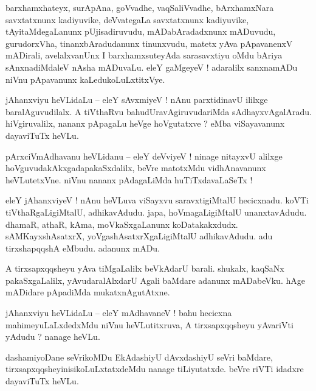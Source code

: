 \documentclass{article}
\begin{document}
\begin{mn}%
barxhamxhateyx, surApAna, goVvadhe, vaqSaliVvadhe, bArxhamxNara savxtatxnunx kadiyuvike, 
deVvategaLa savxtatxnunx kadiyuvike, tAyitaMdegaLanunx pUjisadiruvudu, mADabAradadxnunx mADuvudu, 
gurudorxVha, tinanxbAradudanunx tinunxvudu, matetx yAva pApavanenxV mADirali, avelalxvanUnx I 
barxhamxsuteyAda sarasavxtiyu oMdu bAriya sAnxnadiMdaleV nAsha mADuvaLu. eleY gaMgeyeV ! adaralilx 
sanxnamADu niVnu pApavanunx kaLedukoLuLxtitxVye.
\end{mn}

\begin{mn}%
jAhanxviyu heVLidaLu -- eleY sAvxmiyeV ! nAnu parxtidinavU ililxge baralAguvudilalx. A tiVthaRvu 
bahudUravAgiruvudariMda sAdhayxvAgalAradu. hiVgiruvalilx, nananx pApagaLu heVge hoVgutatxve ? eMba 
viSayavanunx dayaviTuTx heVLu.
\end{mn}

\begin{mn}%
pArxciVmAdhavanu heVLidanu -- eleY deVviyeV ! ninage nitayxvU alilxge 
hoVguvudakAkxgadapakaSxdalilx, beVre matotxMdu vidhAnavanunx heVLutetxVne. niVnu nananx 
pAdagaLiMda huTiTxdavaLaSeTx !
\end{mn}

\begin{mn}%
eleY jAhanxviyeV ! nAnu heVLuva viSayxvu saravxtigiMtalU hecicxnadu. koVTi tiVthaRgaLigiMtalU, 
adhikavAdudu. japa, hoVmagaLigiMtalU unanxtavAdudu. dhamaR, athaR, kAma, moVkaSxgaLanunx 
koDatakakxdudx. sAMKayxshAsatxrX, yoVgashAsatxrXgaLigiMtalU adhikavAdudu. adu tirxshapqqshA  
eMbudu. adanunx mADu.
\end{mn}

\begin{mn}%
A tirxsapxqqsheyu yAva tiMgaLalilx beVkAdarU barali. shukalx, kaqSaNx pakaSxgaLalilx, 
yAvudaralAlxdarU Agali baMdare adanunx mADabeVku. hAge mADidare pApadiMda mukatxnAgutAtxne.
\end{mn}

\begin{mn}%
jAhanxviyu heVLidaLu -- eleY mAdhavaneV ! bahu hecicxna mahimeyuLaLxdedxMdu niVnu heVLutitxruva, A 
tirxsapxqqsheyu yAvariVti yAdudu ? nanage heVLu.
\end{mn}

\begin{mn}%
dashamiyoDane seVrikoMDu EkAdashiyU dAvxdashiyU seVri baMdare, tirxsapxqqsheyinisikoLuLxtatxdeMdu 
nanage tiLiyutatxde. beVre riVTi idadxre dayaviTuTx heVLu.
\end{mn}
\end{document}
